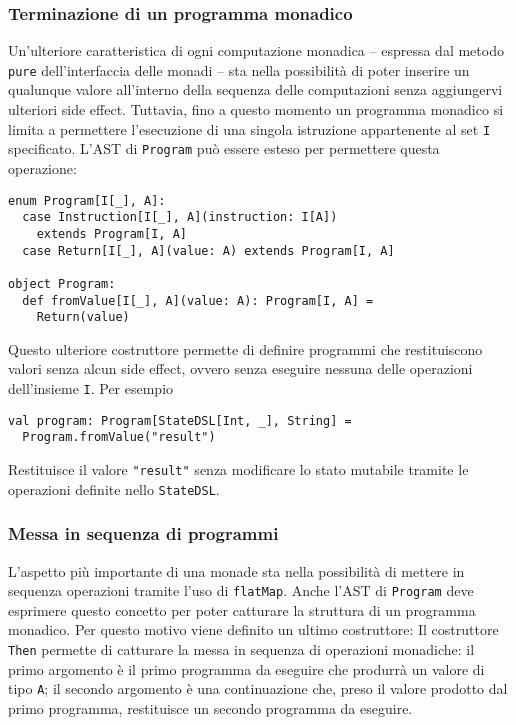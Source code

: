 \subsubsection{Terminazione di un programma monadico}
Un'ulteriore caratteristica di ogni computazione monadica -- espressa dal metodo \lstinline{pure} dell'interfaccia delle monadi -- sta nella possibilità di poter inserire un qualunque valore all'interno della sequenza delle computazioni senza aggiungervi ulteriori side effect.
Tuttavia, fino a questo momento un programma monadico si limita a permettere l'esecuzione di una singola istruzione appartenente al set \lstinline{I} specificato. L'AST di \lstinline{Program} può essere esteso per permettere questa operazione:
\begin{lstlisting}[language=scala3]
enum Program[I[_], A]:
  case Instruction[I[_], A](instruction: I[A])
    extends Program[I, A]
  case Return[I[_], A](value: A) extends Program[I, A]

object Program:
  def fromValue[I[_], A](value: A): Program[I, A] =
    Return(value)
\end{lstlisting}

Questo ulteriore costruttore permette di definire programmi che restituiscono valori senza alcun side effect, ovvero senza eseguire nessuna delle operazioni dell'insieme \lstinline{I}. Per esempio
\begin{lstlisting}[language=scala3]
val program: Program[StateDSL[Int, _], String] =
  Program.fromValue("result")
\end{lstlisting}
Restituisce il valore \lstinline{"result"} senza modificare lo stato mutabile tramite le operazioni definite nello \lstinline{StateDSL}.

\subsubsection{Messa in sequenza di programmi}
L'aspetto più importante di una monade sta nella possibilità di mettere in sequenza operazioni tramite l'uso di \lstinline{flatMap}.
Anche l'AST di \lstinline{Program} deve esprimere questo concetto per poter catturare la struttura di un programma monadico. Per questo motivo viene definito un ultimo costruttore:
Il costruttore \lstinline{Then} permette di catturare la messa in sequenza di operazioni monadiche: il primo argomento è il primo programma da eseguire che produrrà un valore di tipo \lstinline{A}; il secondo argomento è una continuazione che, preso il valore prodotto dal primo programma, restituisce un secondo programma da eseguire.

